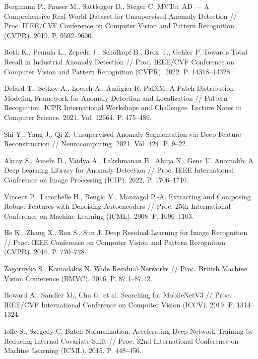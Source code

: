 \documentclass[14pt,a4paper]{extreport}
\begin{document}
\begin{enumerate}[label={[\arabic*]},ref={\arabic*},leftmargin=*,labelindent=0pt]
\item \label{ref:mvtec} Bergmann P., Fauser M., Sattlegger D., Steger C. MVTec AD --- A Comprehensive Real-World Dataset for Unsupervised Anomaly Detection // Proc. IEEE/CVF Conference on Computer Vision and Pattern Recognition (CVPR). 2019. P. 9592--9600.
\item \label{ref:patchcore} Roth K., Pemula L., Zepeda J., Schölkopf B., Brox T., Gehler P. Towards Total Recall in Industrial Anomaly Detection // Proc. IEEE/CVF Conference on Computer Vision and Pattern Recognition (CVPR). 2022. P. 14318--14328.
\item \label{ref:padim} Defard T., Setkov A., Loesch A., Audigier R. PaDiM: A Patch Distribution Modeling Framework for Anomaly Detection and Localization // Pattern Recognition. ICPR International Workshops and Challenges. Lecture Notes in Computer Science. 2021. Vol. 12664. P. 475--489.
\item \label{ref:dfr} Shi Y., Yang J., Qi Z. Unsupervised Anomaly Segmentation via Deep Feature Reconstruction // Neurocomputing. 2021. Vol. 424. P. 9--22.
\item \label{ref:anomalib} Akcay S., Ameln D., Vaidya A., Lakshmanan B., Ahuja N., Genc U. Anomalib: A Deep Learning Library for Anomaly Detection // Proc. IEEE International Conference on Image Processing (ICIP). 2022. P. 1706--1710.
\item \label{ref:dae} Vincent P., Larochelle H., Bengio Y., Manzagol P.-A. Extracting and Composing Robust Features with Denoising Autoencoders // Proc. 25th International Conference on Machine Learning (ICML). 2008. P. 1096--1103.
\item \label{ref:resnet} He K., Zhang X., Ren S., Sun J. Deep Residual Learning for Image Recognition // Proc. IEEE Conference on Computer Vision and Pattern Recognition (CVPR). 2016. P. 770--778.
\item \label{ref:wrn} Zagoruyko S., Komodakis N. Wide Residual Networks // Proc. British Machine Vision Conference (BMVC). 2016. P. 87.1--87.12.
\item \label{ref:mobilenet} Howard A., Sandler M., Chu G. et al. Searching for MobileNetV3 // Proc. IEEE/CVF International Conference on Computer Vision (ICCV). 2019. P. 1314--1324.
\item \label{ref:bn} Ioffe S., Szegedy C. Batch Normalization: Accelerating Deep Network Training by Reducing Internal Covariate Shift // Proc. 32nd International Conference on Machine Learning (ICML). 2015. P. 448--456.

\end{enumerate}
\end{document}
